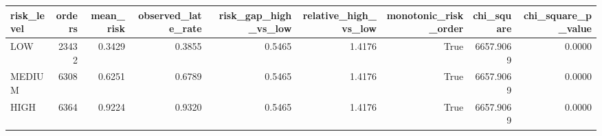 \begin{tabular}{lrrrrrrrr}
\toprule
risk_level & orders & mean_risk & observed_late_rate & risk_gap_high_vs_low & relative_high_vs_low & monotonic_risk_order & chi_square & chi_square_p_value \\
\midrule
LOW & 23432 & 0.3429 & 0.3855 & 0.5465 & 1.4176 & True & 6657.9069 & 0.0000 \\
MEDIUM & 6308 & 0.6251 & 0.6789 & 0.5465 & 1.4176 & True & 6657.9069 & 0.0000 \\
HIGH & 6364 & 0.9224 & 0.9320 & 0.5465 & 1.4176 & True & 6657.9069 & 0.0000 \\
\bottomrule
\end{tabular}
